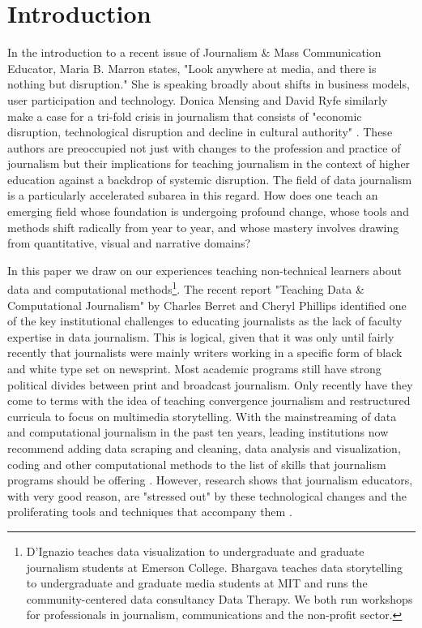 \documentclass{acm_proc_article-sp}
\begin{document}
\section{Introduction}

In the introduction to a recent issue of Journalism \& Mass Communication Educator, Maria B. Marron states, "Look anywhere at media, and there is nothing but disruption." \cite{marron_nothing_2016} She is speaking broadly about shifts in business models, user participation and technology. Donica Mensing and David Ryfe similarly make a case for a tri-fold crisis in journalism that consists of "economic disruption, technological disruption and decline in cultural authority" \cite{anderson_sociology_2014, mensing_blueprint_2013}. These authors are preoccupied not just with changes to the profession and practice of journalism but their implications for teaching journalism in the context of higher education against a backdrop of systemic disruption. The field of data journalism is a particularly accelerated subarea in this regard. How does one teach an emerging field whose foundation is undergoing profound change, whose tools and methods shift radically from year to year, and whose mastery involves drawing from quantitative, visual and narrative domains?  

In this paper we draw on our experiences teaching non-technical learners about data and computational methods\footnote{D'Ignazio teaches data visualization to undergraduate and graduate journalism students at Emerson College. Bhargava teaches data storytelling to undergraduate and graduate media students at MIT and runs the community-centered data consultancy Data Therapy. We both run workshops for professionals in journalism, communications and the non-profit sector.}. The recent report "Teaching Data \& Computational Journalism" \cite{mensing_blueprint_2013} by Charles Berret and Cheryl Phillips identified one of the key institutional challenges to educating journalists as the lack of faculty expertise in data journalism. This is logical, given that it was only until fairly recently that journalists were mainly writers working in a specific form of black and white type set on newsprint. Most academic programs still have strong political divides between print and broadcast journalism. Only recently have they come to terms with the idea of teaching convergence journalism \cite{kolodzy_convergence_2006} and restructured curricula to focus on multimedia storytelling. With the mainstreaming of data and computational journalism in the past ten years, leading institutions now recommend adding data scraping and cleaning, data analysis and visualization, coding and other computational methods to the list of skills that journalism programs should be offering \cite{berret_teaching_2016}. However, research shows that journalism educators, with very good reason, are "stressed out" by these technological changes and the proliferating tools and techniques that accompany them \cite{voakes_impact_2003}.
\end{document}
